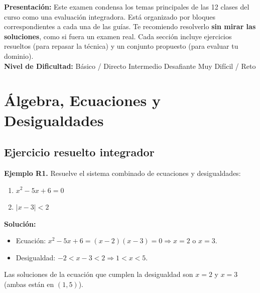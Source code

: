 \documentclass[12pt, letterpaper]{article}
\begin{document}


\vspace{4pt}
\begin{cuadroinfo}
  \small
  \textbf{Presentación:} Este examen condensa los temas principales de las 12 clases del curso como una evaluación integradora. Está organizado por bloques correspondientes a cada una de las guías. Te recomiendo resolverlo \textbf{sin mirar las soluciones}, como si fuera un examen real. Cada sección incluye ejercicios resueltos (para repasar la técnica) y un conjunto propuesto (para evaluar tu dominio).
  \\[4pt]
  \textbf{Nivel de Dificultad:}\quad
  \facil{} Básico / Directo \quad
  \medio{} Intermedio \quad
  \dificil{} Desafiante \quad
  \muyDificil{} Muy Difícil / Reto
\end{cuadroinfo}

\vspace{8pt}

\section{Álgebra, Ecuaciones y Desigualdades}

\subsection{Ejercicio resuelto integrador}

\textbf{Ejemplo R1.} Resuelve el sistema combinado de ecuaciones y desigualdades:
\begin{enumerate}[label=\roman*)]
  \item $x^2 - 5x + 6 = 0$
  \item $|x - 3| < 2$
\end{enumerate}

\begin{cuadrosolucion}
  \textbf{Solución:}
  \begin{itemize}
    \item Ecuación: $x^2 - 5x + 6 = (x - 2)(x - 3) = 0 \Rightarrow x = 2$ o $x = 3$.
    \item Desigualdad: $-2 < x - 3 < 2 \Rightarrow 1 < x < 5$.
  \end{itemize}
  Las soluciones de la ecuación que cumplen la desigualdad son $x = 2$ y $x = 3$ (ambas están en $(1, 5)$).
\end{cuadrosolucion}
\end{document}
